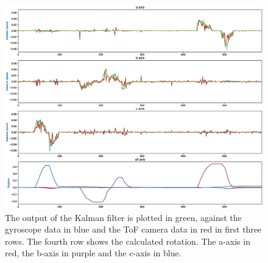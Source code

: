 \begin{figure}[H]
  \centering
  \includegraphics[width=1.0\textwidth]{images/meas_kalman_rotation.eps}
  \caption{The output of the Kalman filter is plotted in green, against the gyroscope data in blue and the ToF camera data in red in first three rows. The fourth row shows the calculated rotation. The a-axis in red, the b-axis in purple and the c-axis in blue.}
  \label{im:meas_kalman_rotation}
\end{figure} 
